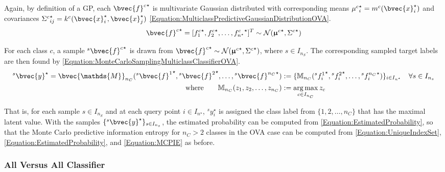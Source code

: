 				Again, by definition of a GP, each ${\bvec{f}^{c}}^{\star}$ is multivariate Gaussian distributed with corresponding means ${\mu^{c}}^{\star}_{i} = m^{c}(\bvec{x}^{\star}_{i})$ and covariances ${\Sigma^{c}}^{\star}_{ij} = k^{c}(\bvec{x}^{\star}_{i}, \bvec{x}^{\star}_{j})$ \eqref{Equation:MulticlassPredictiveGaussianDistributionOVA}. \begin{equation}
					{\bvec{f}^{c}}^{\star} = [{f^{c}_{1}}^{\star}, {f^{c}_{2}}^{\star}, \dots, {f^{c}_{n^{\star}}}^{\star}]^{T} \sim \mathcal{N}({\vec{\upmu}^{c}}^{\star}, {\Sigma^{c}}^{\star})
				\label{Equation:MulticlassPredictiveGaussianDistributionOVA}
				\end{equation}
				
				For each class $c$, a sample ${^{s}}{\bvec{f}^{c}}^{\star}$ is drawn from ${\bvec{f}^{c}}^{\star} \sim \mathcal{N}({\vec{\upmu}^{c}}^{\star}, {\Sigma^{c}}^{\star})$, where $s \in I_{n_{S}}$. The corresponding sampled target labels are then found by \eqref{Equation:MonteCarloSamplingMulticlassClassifierOVA}. \begin{equation}
					\begin{aligned}
						{^{s}}\bvec{y}^{\star} = \bvec{\mathds{M}}_{n_{C}}({^{s}}{\bvec{f}^{1}}^{\star}, {^{s}}{\bvec{f}^{2}}^{\star}, \dots, {^{s}}{\bvec{f}^{n_{C}}}^{\star}) &:= \{\mathbb{M}_{n_{C}}({^{s}}{f^{1}_{i}}^{\star}, {^{s}}{f^{2}_{i}}^{\star}, \dots, {^{s}}{f^{n_{C}}_{i}}^{\star})\}_{i \in I_{n^{\star}}} \quad \forall s \in I_{n_{s}} \\
						\mathrm{where} \qquad \mathbb{M}_{n_{C}}(z_{1}, z_{2}, \dots, z_{n_{C}}) &:= \argmax_{c \in I_{n_{C}}} z_{c}
					\end{aligned}
				\label{Equation:MonteCarloSamplingMulticlassClassifierOVA}
				\end{equation}
				
				That is, for each sample $s \in I_{n_{S}}$ and at each query point $i \in I_{n^{\star}}$, ${^{s}}y^{\star}_{i}$ is assigned the class label from $\{1, 2, \dots, n_{C}\}$ that has the maximal latent value. With the samples $\{{^{s}}\bvec{y}^{\star}\}_{s \in I_{n_{s}}}$, the estimated probability can be computed from \eqref{Equation:EstimatedProbability}, so that the Monte Carlo predictive information entropy for $n_{C} > 2$ classes in the OVA case can be computed from \eqref{Equation:UniqueIndexSet}, \eqref{Equation:EstimatedProbability}, and \eqref{Equation:MCPIE} as before.
			
			\subsubsection{All Versus All Classifier}
			\label{InformativeSeafloorExploration:MCPIE:Multiclass:All}
			
